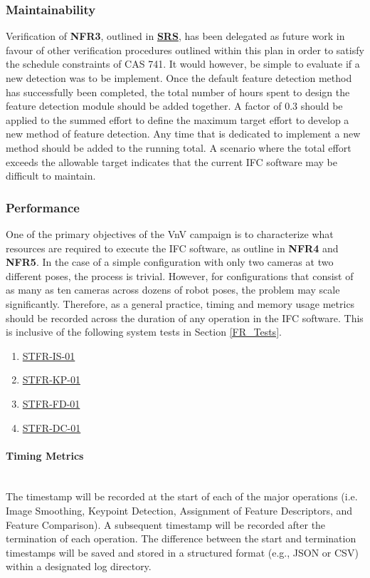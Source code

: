 \documentclass[12pt, titlepage]{article}
\begin{document}
\subsubsection{Maintainability}\label{Maintainability}
Verification of \textbf{NFR3}, outlined in 
\textbf{\href{https://github.com/KiranSingh15/CAS-741-Image-Correspondences/blob/main/docs/SRS/SRS.pdf}
{SRS}}, 
has been delegated as future work in favour of other verification procedures outlined within this 
plan in order to satisfy the schedule constraints of CAS 741. It would however, be simple to evaluate if a 
new detection was to be implement. Once the default feature detection method has 
successfully been completed, the total number of hours spent to design the feature detection module should 
be added together. A factor of 0.3 should be applied to the summed effort to define the maximum target 
effort to develop a new method of feature detection. Any time that is dedicated to implement a new method 
should be added to the running total. A scenario where the total effort exceeds the allowable target 
indicates that the current IFC software may be difficult to maintain.

\subsubsection{Performance}\label{Performance}
One of the primary objectives of the VnV campaign is to characterize what resources are required to execute 
the IFC software, as outline in \textbf{NFR4} and \textbf{NFR5}. In the case of a simple configuration with 
only two cameras at two different poses, the process is trivial. However, for configurations that consist of 
as many as ten cameras across dozens of robot poses, the problem may scale significantly. Therefore, as a 
general practice, timing and memory usage metrics should be recorded across the duration of any operation 
in the IFC software. This is inclusive of the following system tests in Section \ref{FR_Tests}. 
\begin{enumerate}
\item \hyperlink{STFR-IS-01}{STFR-IS-01}
\item \hyperlink{STFR-KP-01}{STFR-KP-01}
\item \hyperlink{STFR-FD-01}{STFR-FD-01}
\item \hyperlink{STFR-DC-01}{STFR-DC-01}
\end{enumerate}
\paragraph{Timing Metrics}
\mbox{}
\\
The timestamp will be recorded at the start of each of the major operations (i.e. 
Image Smoothing, Keypoint Detection, Assignment of Feature Descriptors, and Feature Comparison). 
A subsequent timestamp will be recorded after the termination of each operation. The difference between 
the start and termination timestamps will be saved and stored in a structured format 
(e.g., JSON or CSV) within a designated log directory.
\end{document}

